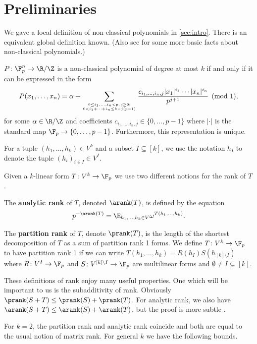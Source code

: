\section{Preliminaries}
\label{sec:preliminaries}

We gave a local definition of non-classical polynomials in \cref{sec:intro}. There is an equivalent global definition known. (Also see \cite[Lemma 1.7]{TZ12} for some more basic facts about non-classical polynomials.)

\begin{lemma}
\label{poly-basis}
$P\colon \F_p^n\to\R/\Z$ is a non-classical polynomial of degree at most $k$ if and only if it can be expressed in the form
\[P(x_1,\ldots,x_n)=\alpha+\sum_{\genfrac{}{}{0pt}{}{0\leq i_1,\ldots,i_n<p,\, j\geq 0:}{0<i_1+\cdots+i_n\leq k-j(p-1)}}\frac{c_{i_1,\ldots,i_n,j}|x_1|^{i_1}\cdots|x_n|^{i_n}}{p^{j+1}}\pmod 1,\]
for some $\alpha\in\R/\Z$ and coefficients $c_{i_1,\ldots,i_n,j}\in\{0,\ldots,p-1\}$ where $|\cdot|$ is the standard map $\F_p\to\{0,\ldots,p-1\}$. Furthermore, this representation is unique.
\end{lemma}

For a tuple $(h_1,\ldots,h_k)\in V^k$ and a subset $I\subseteq[k]$, we use the notation $h_I$ to denote the tuple $(h_i)_{i\in I}\in V^I$.

\begin{defn}
Given a $k$-linear form $T\colon V^k\to\F_p$ we use two different notions for the rank of $T$. 

The \textbf{analytic rank} of $T$, denoted $\arank(T)$, is defined by the equation \[p^{-\arank(T)}=\E_{h_1,\ldots,h_k\in V}\omega^{T(h_1,\ldots,h_k)}.\]

The \textbf{partition rank} of $T$, denote $\prank(T)$, is the length of the shortest decomposition of $T$ as a sum of partition rank 1 forms. We define $T\colon V^k\to\F_p$ to have partition rank 1 if we can write $T(h_1,\ldots,h_k)=R(h_I)S(h_{[k]\setminus I})$ where $R\colon V^I\to\F_p$ and $S\colon V^{[k]\setminus I}\to\F_p$ are multilinear forms and $\emptyset\neq I\subsetneq[k]$.
\end{defn}

These definitions of rank enjoy many useful properties. One which will be important to us is the subadditivity of rank. Obviously $\prank(S+T)\leq\prank(S)+\prank(T)$. For analytic rank, we also have $\arank(S+T)\leq\arank(S)+\arank(T)$, but the proof is more subtle \cite[Theorem 1.5]{Lov19}.

For $k=2$, the partition rank and analytic rank coincide and both are equal to the usual notion of matrix rank. For general $k$ we have the following bounds.

